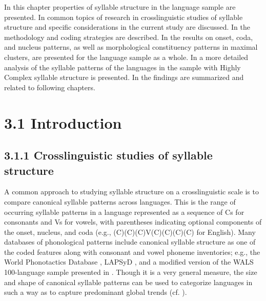   In this chapter properties of syllable structure in the language sample are presented. In  common topics of research in crosslinguistic studies of syllable structure and specific considerations in the current study are discussed. In  the methodology and coding strategies are described. In  the results on onset, coda, and nucleus patterns, as well as morphological constituency patterns in maximal clusters, are presented for the language sample as a whole. In  a more detailed analysis of the syllable patterns of the languages in the sample with Highly Complex syllable structure is presented. In  the findings are summarized and related to following chapters.

\section{3.1 Introduction}
\subsection{3.1.1 Crosslinguistic studies of syllable structure}

  A common approach to studying syllable structure on a crosslinguistic scale is to compare canonical syllable patterns across languages. This is the range of occurring syllable patterns in a language represented as a sequence of Cs for consonants and Vs for vowels, with parentheses indicating optional components of the onset, nucleus, and coda (e.g., (C)(C)(C)V(C)(C)(C)(C) for English). Many databases of phonological patterns include canonical syllable structure as one of the coded features along with consonant and vowel phoneme inventories; e.g.,  the World Phonotactics Database \citep{DonohueEtAl2013}, LAPSyD \citep{MaddiesonEtAl2013}, and a modified version of the WALS 100-language sample presented in \citet{Gordon2016}. Though it is a very general measure, the size and shape of canonical syllable patterns can be used to categorize languages in such a way as to capture predominant global trends (cf. \citealt{Maddieson2013a}).


